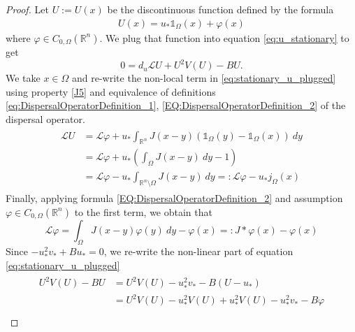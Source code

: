 \documentclass[12pt, a4paper]{article}
\theoremstyle{break}
\theoremstyle{break}
\theoremstyle{break}
\theoremstyle{break}
\theoremstyle{break}
\theoremstyle{break}
\theoremstyle{break}
\begin{document}
\begin{proof}
    Let $U:= U(x)$ be the discontinuous function defined by the formula
    \begin{align}
        \label{eq:stationary_u_definition}
        U(x) 
        = 
        u_* \mathds{1}_{\Omega}(x) + \varphi(x)
    \end{align}
    where $\varphi \in C_{0, \Omega}(\mathbb{R}^n)$. We plug that function into equation \eqref{eq:u_stationary} to get  
    \begin{equation}
        \label{eq:stationary_u_plugged}
        0 = d_u \mathcal{L} U + U^2 V(U) - B U.
    \end{equation}
    We take $x \in \Omega$ and re-write the non-local term in \eqref{eq:stationary_u_plugged} using property \ref{J5} and equivalence of definitions \eqref{eq:DispersalOperatorDefinition_1}, \eqref{EQ:DispersalOperatorDefinition_2} of the dispersal operator.
    \begin{align}
        \label{eq:non-local-part-u-reformulation}
        \begin{split}
        \mathcal{L}U 
        &=
            \mathcal{L}\varphi + u_*  \int_{\mathbb{R}^n} J(x-y)\left(\mathds{1}_{\Omega}(y) - \mathds{1}_{\Omega}(x)\right)\:dy  \\
            &= \mathcal{L}\varphi + u_* \left( \int_\Omega J(x-y)\:dy - 1 \right) \\
            &= \mathcal{L}\varphi - u_*  \int_{\mathbb{R}^n \setminus \Omega} J(x-y)\:dy =: \mathcal{L}\varphi - u_* j_\Omega(x)
        \end{split}
    \end{align}
    Finally, applying formula \eqref{EQ:DispersalOperatorDefinition_2} and assumption $\varphi \in C_{0, \Omega}(\mathbb{R}^n)$ to the first term, we obtain that
    \begin{equation}
        \label{eq:non-local-part-u-stationary-plugged}
        \mathcal{L}\varphi =  \int_{\Omega} J(x-y) \varphi(y)\:dy - \varphi(x) =: J *\varphi(x) - \varphi(x)
    \end{equation}
    Since $-u_*^2v_* + Bu_*=0$, we re-write the non-linear part of equation \eqref{eq:stationary_u_plugged}
    \begin{align}
        \label{eq:non-linear-part-u-stationary-plugged}
        \begin{split}
            U^2 V(U) - B U 
            &= U^2 V(U) - u_*^2 v_* - B (U - u_*) \\
            &= U^2 V(U) - u_*^2 V(U) + u_*^2 V(U) - u_*^2 v_* - B \varphi  \\

\end{split}
\end{align}
\end{proof}
\end{document}
